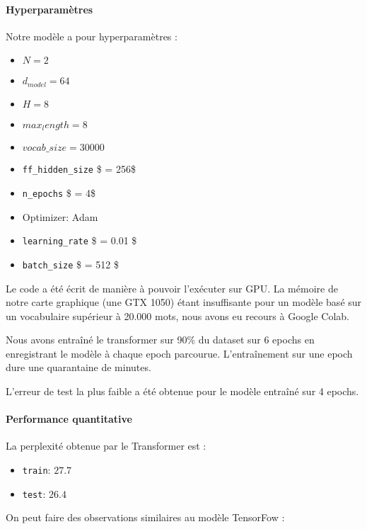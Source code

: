 \hypertarget{hyperparametres}{%
\paragraph{Hyperparamètres}\label{hyperparametres}}

Notre modèle a pour hyperparamètres :
\begin{itemize}
\tightlist
\item
  \(N = 2\)
\item
  \(d_{model} = 64\)
\item
  \(H = 8\)
\item
  \(max_length = 8\)
\item
  \(vocab\_size = 30 000\)
\item
  \texttt{ff\_hidden\_size} \$ = 256\$
\item
  \texttt{n\_epochs} \$ = 4\$
\item
  Optimizer: Adam
\item
  \texttt{learning\_rate} \$ = 0.01 \$
\item
  \texttt{batch\_size} \$ = 512 \$
\end{itemize}

Le code a été écrit de manière à pouvoir l’exécuter sur GPU. La mémoire de notre carte graphique (une GTX 1050) étant insuffisante pour un modèle basé sur un vocabulaire supérieur à 20.000 mots, nous avons eu recours à Google Colab.

Nous avons entraîné le transformer sur 90\% du dataset sur 6 epochs en enregistrant le modèle à chaque epoch parcourue. L'entraînement sur une epoch dure une quarantaine de minutes.

L’erreur de test la plus faible a été obtenue pour le modèle entraîné sur 4 epochs.

\hypertarget{performance-quantitative-1}{%
\paragraph{Performance quantitative}\label{performance-quantitative-1}}

La perplexité obtenue par le Transformer est :

\begin{itemize}
\tightlist
\item
  \texttt{train}: \(27.7\)
\item
  \texttt{test}: \(26.4\)
\end{itemize}

On peut faire des observations similaires au modèle TensorFow :

